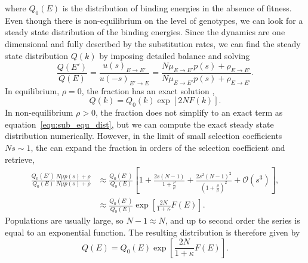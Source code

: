 \documentclass[10pt,a4paper]{article}
\begin{document}
where $Q_0(E)$ is the distribution of binding energies in the absence of fitness. Even though there is non-equilibrium on the level of genotypes, 
we can look for a steady state distribution of the binding energies. Since the dynamics are one dimensional and fully described by the substitution rates, 
we can find the steady state distribution $Q(k)$ by imposing detailed balance and solving
\begin{equation}
\frac{Q(E')}{Q(E)}=\frac{u(s)_{E\rightarrow E'}}{u(-s)_{E'\rightarrow E}}=  \frac{ N\mu_{E\rightarrow E'}p(s)+\rho_{E\rightarrow E'}}{N\mu_{E\rightarrow E'}p(s)
+\rho_{E\rightarrow E'}}.
\end{equation}
In equilibrium, $\rho=0$, the fraction has an exact solution \cite{berg_adaptive_2004},
\begin{equation}
	Q(k) = Q_0(k)\exp[2NF(k)].
	\label{equ:sub_equ_dist}
\end{equation}
In non-equilibrium $\rho>0$, the fraction does not simplify to an exact term as equation~\ref{equ:sub_equ_dist}, but we can compute the exact steady state 
distribution numerically. However, in the limit of small selection coefficients $Ns\sim1$, the can expand the fraction in orders of the selection coefficient 
and retrieve,
\begin{align}
\frac{Q_0(E')}{Q_0(E)}\frac{ N\mu p(s)+\rho}{N\mu p(s)+\rho}&\approx \frac{Q_0(E')}{Q_0(E)}\left[1+\frac{2s(N-1)}{1+\frac{\rho}{\mu}}+\frac{2s^2(N-1)^2}
{(1+\frac{\rho}{\mu})^2}+\mathcal{O}(s^3)\right] ,\nonumber\\
&\approx \frac{Q_0(E')}{Q_0(E)}\exp\left[\frac{2N}{1+\kappa}F(E)\right].
\end{align}
Populations are usually large, so $N-1\approx N$, and up to second order the series is equal to an exponential function. The resulting distribution is therefore 
given by
\begin{equation}
	Q(E) = Q_0(E) \exp\left[ \frac{2N}{1+\kappa} F(E) \right].
\end{equation}
\end{document}
